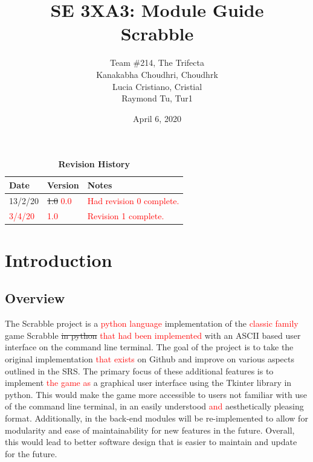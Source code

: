 \documentclass[12pt, titlepage]{article}
\title{SE 3XA3: Module Guide \\ Scrabble}
\author{Team \#214, The Trifecta
		\\ Kanakabha Choudhri, Choudhrk
		\\ Lucia Cristiano, Cristial
		\\ Raymond Tu, Tur1
}
\date{April 6, 2020}
\begin{document}
\maketitle

\tableofcontents
\listoftables
\listoffigures

\begin{table}[bp]
\caption{\bf Revision History}
\begin{tabularx}{\textwidth}{p{3cm}p{2cm}X}
\toprule {\bf Date} & {\bf Version} & {\bf Notes}\\
\midrule
13/2/20 & \sout{1.0}  \textcolor{red}{0.0} & \textcolor{red}{Had revision 0 complete.}\\
\textcolor{red}{3/4/20} & \textcolor{red}{1.0} & \textcolor{red}{Revision 1 complete.}\\
\bottomrule
\end{tabularx}
\end{table}

\newpage


\section{Introduction} %

\subsection{Overview}

The Scrabble project is a \textcolor{red}{python language} implementation of the \textcolor{red}{classic family} game Scrabble \sout{in python} \textcolor{red}{that had been implemented} with an ASCII based user interface on the command line terminal. The goal of the project is to take the original implementation \textcolor{red}{that exists} on Github and improve on various aspects outlined in the SRS. The primary focus of these additional features is to implement \textcolor{red}{the game as} a graphical user interface using the Tkinter library in python. This would make the game more accessible to users not familiar with use of the command line terminal, in an easily understood \textcolor{red}{and} aesthetically pleasing format. Additionally, in the back-end modules will be re-implemented to allow for modularity and ease of maintainability for new features in the future. Overall, this would lead to better software design that is easier to maintain and update for the future. 
\end{document}
